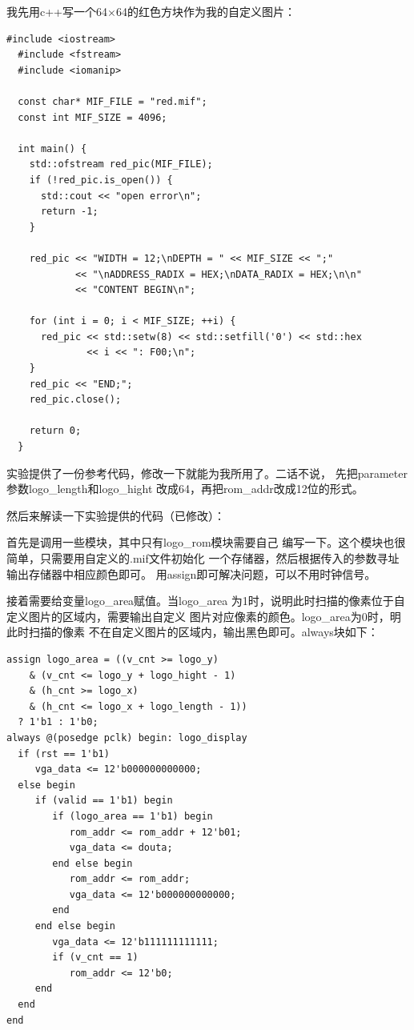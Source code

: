 \documentclass[12pt,a4paper,UTF8]{article}
\begin{document}
我先用c++写一个64$\times$64的红色方块作为我的自定义图片：
\begin{lstlisting}[style=cpp-style]
  #include <iostream>
  #include <fstream>
  #include <iomanip>
  
  const char* MIF_FILE = "red.mif";
  const int MIF_SIZE = 4096;
  
  int main() {
    std::ofstream red_pic(MIF_FILE);
    if (!red_pic.is_open()) {
      std::cout << "open error\n";
      return -1;
    }
  
    red_pic << "WIDTH = 12;\nDEPTH = " << MIF_SIZE << ";"
            << "\nADDRESS_RADIX = HEX;\nDATA_RADIX = HEX;\n\n"
            << "CONTENT BEGIN\n";
  
    for (int i = 0; i < MIF_SIZE; ++i) {
      red_pic << std::setw(8) << std::setfill('0') << std::hex
              << i << ": F00;\n";
    }
    red_pic << "END;";
    red_pic.close();
  
    return 0;
  }
\end{lstlisting}

实验提供了一份参考代码，修改一下就能为我所用了。二话不说，
先把parameter参数\mbox{logo\_length}和\mbox{logo\_hight}
改成64，再把\mbox{rom\_addr}改成12位的形式。

然后来解读一下实验提供的代码（已修改）：

首先是调用一些模块，其中只有\mbox{logo\_rom}模块需要自己
编写一下。这个模块也很简单，只需要用自定义的.mif文件初始化
一个存储器，然后根据传入的参数寻址输出存储器中相应颜色即可。
用assign即可解决问题，可以不用时钟信号。

接着需要给变量\mbox{logo\_area}赋值。当\mbox{logo\_area}
为1时，说明此时扫描的像素位于自定义图片的区域内，需要输出自定义
图片对应像素的颜色。\linebreak[4]
\mbox{logo\_area}为0时，明此时扫描的像素
不在自定义图片的区域内，输出黑色即可。always块如下：
\begin{lstlisting}[style=verilog-style]
assign logo_area = ((v_cnt >= logo_y) 
    & (v_cnt <= logo_y + logo_hight - 1) 
    & (h_cnt >= logo_x) 
    & (h_cnt <= logo_x + logo_length - 1)) 
  ? 1'b1 : 1'b0;
always @(posedge pclk) begin: logo_display
  if (rst == 1'b1)
     vga_data <= 12'b000000000000;
  else begin
     if (valid == 1'b1) begin
        if (logo_area == 1'b1) begin
           rom_addr <= rom_addr + 12'b01;
           vga_data <= douta;
        end else begin
           rom_addr <= rom_addr;
           vga_data <= 12'b000000000000;
        end
     end else begin
        vga_data <= 12'b111111111111;
        if (v_cnt == 1)
           rom_addr <= 12'b0;
     end
  end
end
\end{lstlisting}
\end{document}
